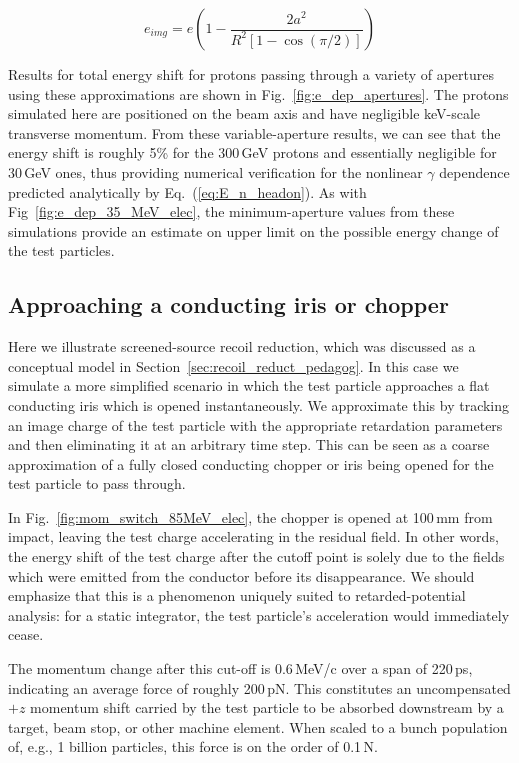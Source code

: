 \documentclass[reprint,
               amsmath,amssymb,nofootinbib, aps%
              ]{revtex4-2}
\begin{document}
\begin{equation}
    e_{img} = e\left( 1- \frac{2 a^2}{R^2\left[1 - \operatorname{cos}(\pi / 2)\right]} \right)
    \label{eq:image_charge_fraction}
\end{equation}

Results for total energy shift for protons passing through a variety of apertures using these approximations are shown in Fig.~\ref{fig:e_dep_apertures}. The protons simulated here are positioned on the beam axis and have negligible keV-scale transverse momentum. From these variable-aperture results, we can see that the energy shift is roughly 5\% for the 300\,GeV protons and essentially negligible for 30\,GeV ones, thus providing numerical verification for the nonlinear $\gamma$ dependence predicted analytically by Eq.~(\ref{eq:E_n_headon}). %
 As with Fig~\ref{fig:e_dep_35_MeV_elec}, the minimum-aperture values from these simulations provide an estimate on upper limit on the possible energy change of the test particles.


\subsection{Approaching a conducting iris or chopper}\label{sec:results_conducting_surface}
Here we illustrate screened-source recoil reduction, which was discussed as a conceptual model in Section~\ref{sec:recoil_reduct_pedagog}. In this case we simulate a more simplified scenario in which the test particle approaches a flat conducting iris which is opened instantaneously. We approximate this by tracking an image charge of the test particle with the appropriate retardation parameters and then eliminating it at an arbitrary time step. This can be seen as a coarse approximation of a fully closed conducting chopper or iris being opened for the test particle to pass through.

In Fig.~\ref{fig:mom_switch_85MeV_elec}, the chopper is opened at 100\,mm from impact, leaving the test charge accelerating in the residual field. In other words, the energy shift of the test charge after the cutoff point is solely due to the fields which were emitted from the conductor before its disappearance. We should emphasize that this is a phenomenon uniquely suited to retarded-potential analysis: for a static integrator, the test particle's acceleration would immediately cease.

The momentum change after this cut-off is 0.6\,MeV/c over a span of 220\,ps, indicating an average force of roughly 200\,pN. This constitutes an uncompensated $+z$ momentum shift carried by the test particle to be absorbed downstream by a target, beam stop, or other machine element. When scaled to a bunch population of, e.g., 1 billion particles, this force is on the order of 0.1\,N. %
\vspace{-0.25cm}
\end{document}
